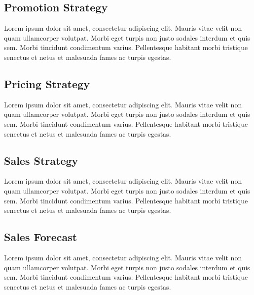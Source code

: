 \documentclass[11pt,a4paper,titlepage]{article}
\begin{document}
\subsection{Promotion  Strategy}
Lorem ipsum dolor sit amet, consectetur adipiscing elit. Mauris vitae velit 
non quam ullamcorper volutpat. Morbi eget turpis non justo sodales interdum 
et quis sem. Morbi tincidunt condimentum varius. Pellentesque habitant morbi 
tristique senectus et netus et malesuada fames ac turpis egestas.\newline

\subsection{Pricing Strategy}
Lorem ipsum dolor sit amet, consectetur adipiscing elit. Mauris vitae velit 
non quam ullamcorper volutpat. Morbi eget turpis non justo sodales interdum 
et quis sem. Morbi tincidunt condimentum varius. Pellentesque habitant morbi 
tristique senectus et netus et malesuada fames ac turpis egestas.\newline

\subsection{Sales Strategy}
Lorem ipsum dolor sit amet, consectetur adipiscing elit. Mauris vitae velit 
non quam ullamcorper volutpat. Morbi eget turpis non justo sodales interdum 
et quis sem. Morbi tincidunt condimentum varius. Pellentesque habitant morbi 
tristique senectus et netus et malesuada fames ac turpis egestas.\newline

\subsection{Sales Forecast}
Lorem ipsum dolor sit amet, consectetur adipiscing elit. Mauris vitae velit 
non quam ullamcorper volutpat. Morbi eget turpis non justo sodales interdum 
et quis sem. Morbi tincidunt condimentum varius. Pellentesque habitant morbi 
tristique senectus et netus et malesuada fames ac turpis egestas.\newline
\pagebreak
\end{document}

